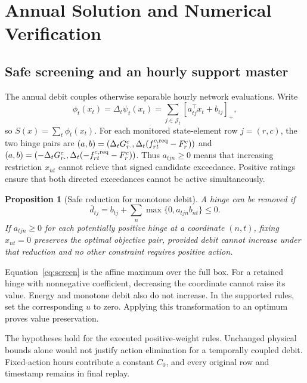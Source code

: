 \documentclass[10pt,journal]{IEEEtran}
\newtheorem{proposition}{Proposition}
\newcommand{\pos}[1]{\left[#1\right]_+}
\begin{document}
\section{Annual Solution and Numerical Verification}
\label{sec:solution}
\subsection{Safe screening and an hourly support master}
The annual debit couples otherwise separable hourly network evaluations. Write
\begin{equation}
\phi_t(x_t)=\Delta_t\psi_t(x_t)=\sum_{j\in\mathcal J_t}\pos{a_{tj}^\top x_t+b_{tj}},
\label{eq:hinges}
\end{equation}
so $S(x)=\sum_t\phi_t(x_t)$. For each monitored state-element row $j=(r,c)$, the two hinge pairs are $(a,b)=(\Delta_tG^c_{r\cdot},\Delta_t(f_{rt}^{c,\rm req}-F_r^c))$ and $(a,b)=(-\Delta_tG^c_{r\cdot},\Delta_t(-f_{rt}^{c,\rm req}-F_r^c))$. Thus $a_{tjn}\geq0$ means that increasing restriction $x_{nt}$ cannot relieve that signed candidate exceedance. Positive ratings ensure that both directed exceedances cannot be active simultaneously.

\begin{proposition}[Safe reduction for monotone debit]
\label{prop:screen}
A hinge can be removed if
\begin{equation}
\overline d_{tj}=b_{tj}+\sum_n\max\{0,a_{tjn}b_{nt}\}\leq0.
\label{eq:screen}
\end{equation}
If $a_{tjn}\geq0$ for each potentially positive hinge at a coordinate $(n,t)$, fixing $x_{nt}=0$ preserves the optimal objective pair, provided debit cannot increase under that reduction and no other constraint requires positive action.
\end{proposition}
\begin{IEEEproof}
Equation~\eqref{eq:screen} is the affine maximum over the full box. For a retained hinge with nonnegative coefficient, decreasing the coordinate cannot raise its value. Energy and monotone debit also do not increase. In the supported rules, set the corresponding $u$ to zero. Applying this transformation to an optimum proves value preservation.
\end{IEEEproof}
The hypotheses hold for the executed positive-weight rules. Unchanged physical bounds alone would not justify action elimination for a temporally coupled debit. Fixed-action hours contribute a constant $C_0$, and every original row and timestamp remains in final replay.
\end{document}
